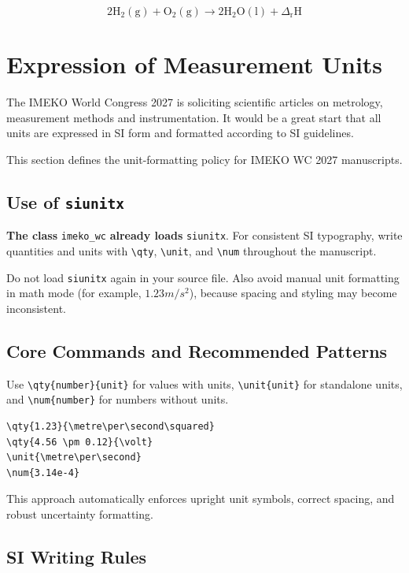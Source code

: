 \documentclass{imeko_wc}
\begin{document}
\begin{equation}
\label{eq:example3}
2\mathrm{H_2 (g)}+\mathrm{O}_2\mathrm{(g)} \rightarrow
2\mathrm{H_2O(l)}+\Delta_\mathrm{r} \mathrm{H}
\end{equation}

\section{Expression of Measurement Units}

The IMEKO World Congress 2027 is soliciting scientific articles on metrology, measurement methods and instrumentation. It would be a great start that all units are expressed in SI form and formatted according to SI guidelines.
\medskip

This section defines the unit-formatting policy for IMEKO WC 2027 manuscripts.

\subsection{Use of \texttt{siunitx}}

\textbf{The class} \verb|imeko_wc| \textbf{already loads} \verb|siunitx|. For consistent SI typography, write quantities and units with \verb|\qty|, \verb|\unit|, and \verb|\num| throughout the manuscript.

Do not load \verb|siunitx| again in your source file. Also avoid manual unit formatting in math mode (for example, $1.23 m/s^2$), because spacing and styling may become inconsistent.

\subsection{Core Commands and Recommended Patterns}

Use \verb|\qty{number}{unit}| for values with units, \verb|\unit{unit}| for standalone units, and \verb|\num{number}| for numbers without units.

\begin{verbatim}
\qty{1.23}{\metre\per\second\squared}
\qty{4.56 \pm 0.12}{\volt}
\unit{\metre\per\second}
\num{3.14e-4}
\end{verbatim}

This approach automatically enforces upright unit symbols, correct spacing, and robust uncertainty formatting.

\subsection{SI Writing Rules}
\end{document}
